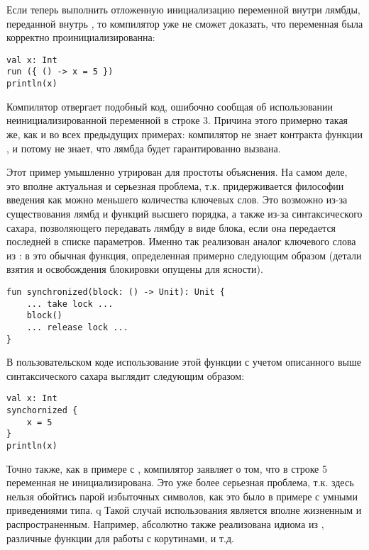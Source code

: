 Если теперь выполнить отложенную инициализацию переменной внутри лямбды, переданной внутрь , то компилятор уже не сможет доказать, что переменная была корректно проинициализированна:

\begin{verbatim}
val x: Int
run ({ () -> x = 5 })
println(x)
\end{verbatim}

Компилятор отвергает подобный код, ошибочно сообщая об использовании неинициализированной переменной в строке 3. Причина этого примерно такая же, как и во всех предыдущих примерах: компилятор не знает контракта функции , и потому не знает, что лямбда  будет гарантированно вызвана.

Этот пример умышленно утрирован для простоты объяснения. На самом деле, это вполне актуальная и серьезная проблема, т.к.  придерживается философии введения как можно меньшего количества ключевых слов. Это возможно из-за существования лямбд и функций высшего порядка, а также из-за синтаксического сахара, позволяющего передавать лямбду в виде блока, если она передается последней в списке параметров. Именно так реализован аналог ключевого слова  из : в  это обычная функция, определенная примерно следующим образом (детали взятия и освобождения блокировки опущены для ясности).

\begin{verbatim}
fun synchronized(block: () -> Unit): Unit {
    ... take lock ...
    block()
    ... release lock ...
}
\end{verbatim}

В пользовательском коде использование этой функции с учетом описанного выше синтаксического сахара выглядит следующим образом:

\begin{verbatim}
val x: Int
synchornized {
    x = 5
}
println(x)
\end{verbatim}

Точно также, как в примере с , компилятор заявляет о том, что в строке 5 переменная  не инициализирована. Это уже более серьезная проблема, т.к. здесь нельзя обойтись парой избыточных символов, как это было в примере с умными приведениями типа.
q
Такой случай использования является вполне жизненным и распространенным. Например, абсолютно также реализована идиома  из , различные функции для работы с корутинами, и т.д.

